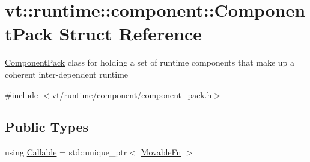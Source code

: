 \hypertarget{structvt_1_1runtime_1_1component_1_1_component_pack}{}\section{vt\+:\+:runtime\+:\+:component\+:\+:Component\+Pack Struct Reference}
\label{structvt_1_1runtime_1_1component_1_1_component_pack}


{\ttfamily \hyperlink{structvt_1_1runtime_1_1component_1_1_component_pack}{Component\+Pack}} class for holding a set of runtime components that make up a coherent inter-\/dependent runtime  




{\ttfamily \#include $<$vt/runtime/component/component\+\_\+pack.\+h$>$}

\subsection*{Public Types}
\begin{DoxyCompactItemize}
\item 
using \hyperlink{structvt_1_1runtime_1_1component_1_1_component_pack_aa4389ab338cdac3a8900a9e777c0d3c9}{Callable} = std\+::unique\+\_\+ptr$<$ \hyperlink{structvt_1_1runtime_1_1component_1_1_movable_fn}{Movable\+Fn} $>$
\end{DoxyCompactItemize}
